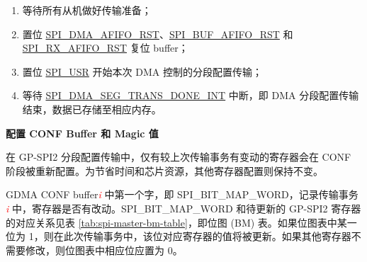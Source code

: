 \documentclass[main\_\_CN.tex]{subfiles}
\begin{document}
\begin{enumerate}
   \item 等待所有从机做好传输准备；

    \item 置位 \hyperref[fielddesc:SPIDMAAFIFORST]{SPI\_DMA\_AFIFO\_RST}、\hyperref[fielddesc:SPIBUFAFIFORST]{SPI\_BUF\_AFIFO\_RST} 和 \hyperref[fielddesc:SPIRXAFIFORST]{SPI\_RX\_AFIFO\_RST} 复位 buffer；

   \item 置位 \hyperref[fielddesc:SPIUSR]{SPI\_USR} 开始本次 DMA 控制的分段配置传输；

   \item 等待 \hyperref[int:SPIDMASEGTRANSDONEINT]{SPI\_DMA\_SEG\_TRANS\_DONE\_INT} 中断，即 DMA 分段配置传输结束，数据已存储至相应内存。
 \end{enumerate}

\textbf{配置 CONF Buffer 和 Magic 值}\label{sec:spi-sct-conf-buffer-magic-value}

在 GP-SPI2 分段配置传输中，仅有较上次传输事务有变动的寄存器会在 CONF 阶段被重新配置。为节省时间和芯片资源，其他寄存器配置则保持不变。

GDMA CONF buffer\textcolor{red}{\it i} 中第一个字，即 SPI\_BIT\_MAP\_WORD，记录传输事务 \textcolor{red}{\it i} 中，寄存器是否有改动。SPI\_BIT\_MAP\_WORD 和待更新的 GP-SPI2 寄存器的对应关系见表  \ref{tab:spi-master-bm-table}，即位图 (BM) 表。如果位图表中某一位为 1，则在此次传输事务中，该位对应寄存器的值将被更新。如果其他寄存器不需要修改，则位图表中相应位应置为 0。
\end{document}
